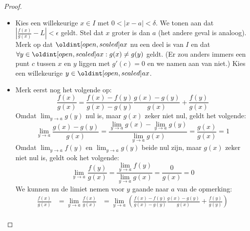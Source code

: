 \documentclass[main.tex]{subfiles}
\begin{document}
\begin{st}
\begin{proof}
\begin{itemize}
      \begin{itemize}
      \item 
        Kies een willekeurige $x\in I$ met $0<|x-a|< \delta$.
        We tonen aan dat $\left|\frac{f(x)}{g(x)}-L\right|<\epsilon$ geldt.
        Stel dat $x$ groter is dan $a$ (het andere geval is analoog).
        Merk op dat $\interval[open]{a}{x}$ nu een deel is van $I$ en dat $\forall y \in \interval[open]{a}{x}: g(x)\neq g(y)$ geldt.
        (Er zou anders immers een punt $c$ tussen $x$ en $y$ liggen met $g'(c) =0$ en we namen aan van niet.)
        Kies een willekeurige $y \in \interval[open]{a}{x}$.
        \begin{figure}[H]
          \centering
        \end{figure}
      \item 
        Merk eerst nog het volgende op:
        \[ \frac{f(x)}{g(x)} = \frac{f(x)-f(y)}{g(x)-g(y)}\frac{g(x)-g(y)}{g(x)} + \frac{f(y)}{g(x)} \]
        Omdat $\lim_{y \rightarrow a}g(y)$ nul is, maar $g(x)$ zeker niet nul, geldt het volgende:
        \[ \lim_{y \rightarrow a}\frac{g(x)-g(y)}{g(x)} = \frac{\lim_{y \rightarrow a}g(x)-\lim_{y \rightarrow a}g(y)}{\lim_{y \rightarrow a}g(x)} = \frac{g(x)}{g(x)} = 1 \]
        Omdat $\lim_{y\rightarrow a}f(y)$ en $\lim_{y \rightarrow a}g(y)$ beide nul zijn, maar $g(x)$ zeker niet nul is, geldt ook het volgende:
        \[ \lim_{y \rightarrow a}\frac{f(y)}{g(x)} = \frac{\lim_{y \rightarrow a}f(y)}{\lim_{y \rightarrow a}g(x)} = \frac{0}{g(x)} = 0 \]
        We kunnen nu de limiet nemen voor $y$ gaande naar $a$ van de opmerking:
        \[
        \begin{array}{rcl}
          \frac{f(x)}{g(x)}
          &= \lim_{y \rightarrow a}\frac{f(x)}{g(x)}
          &= \lim_{y \rightarrow a}\left(\frac{f(x)-f(y)}{g(x)-g(y)}\frac{g(x)-g(y)}{g(x)} + \frac{f(y)}{g(y)}\right)\\

\end{array}\]
\end{itemize}
\end{itemize}
\end{proof}
\end{st}
\end{document}
